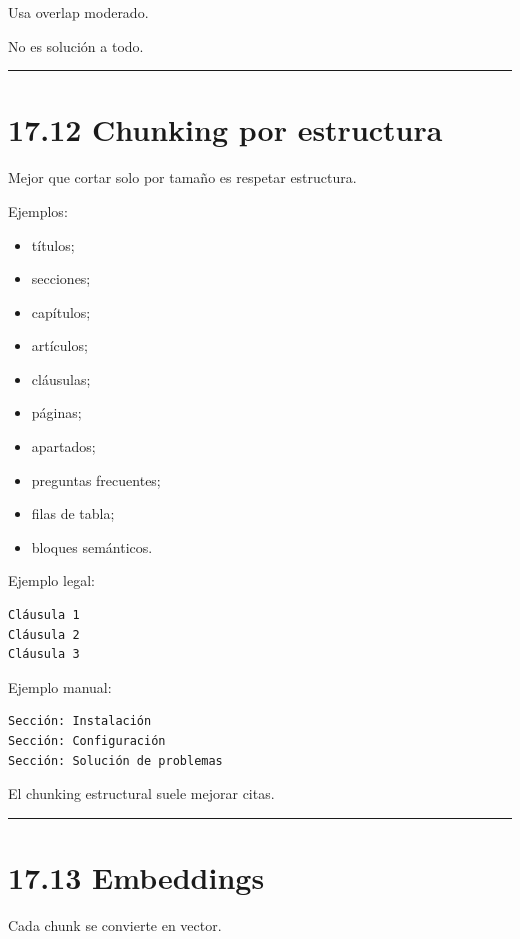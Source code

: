 Usa overlap moderado.

No es solución a todo.

\begin{center}\rule{0.5\linewidth}{0.5pt}\end{center}

\section{17.12 Chunking por estructura}\label{chunking-por-estructura}

Mejor que cortar solo por tamaño es respetar estructura.

Ejemplos:

\begin{itemize}
\tightlist
\item
  títulos;
\item
  secciones;
\item
  capítulos;
\item
  artículos;
\item
  cláusulas;
\item
  páginas;
\item
  apartados;
\item
  preguntas frecuentes;
\item
  filas de tabla;
\item
  bloques semánticos.
\end{itemize}

Ejemplo legal:

\begin{lstlisting}
Cláusula 1
Cláusula 2
Cláusula 3
\end{lstlisting}

Ejemplo manual:

\begin{lstlisting}
Sección: Instalación
Sección: Configuración
Sección: Solución de problemas
\end{lstlisting}

El chunking estructural suele mejorar citas.

\begin{center}\rule{0.5\linewidth}{0.5pt}\end{center}

\section{17.13 Embeddings}\label{embeddings-2}

Cada chunk se convierte en vector.

